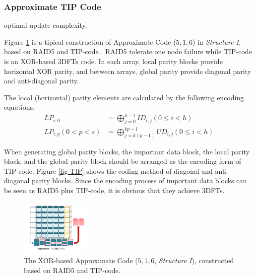 \documentclass[sigconf]{acmart}
\begin{document}
\subsubsection{Approximate TIP Code}

optimal update complexity.

Figure \ref{fig-ap-TIP} is a tipical construction of Approximate Code ($5,1,6$) in \emph{Structure I}, based on RAID5 and TIP-code \cite{zhang2015tip}. RAID5 tolerate one node failure while TIP-code is an XOR-based 3DFTs code. In each array, local parity blocks provide horizontal XOR parity, and between arrays, global parity provide diagonal parity and anti-diagonal parity. 

The local (horizontal) parity elements are calculated by the following encoding equations.
\begin{align}
    LP_{i,0} &= \bigoplus_{j=0}^{k-1} ID_{i,j} (0 \leqslant i < h)\\
    LP_{i,p}(0<p<s) &= \bigoplus_{j=k(p-1)}^{kp-1} UD_{i,j} (0 \leqslant i < h)
\end{align}

When generating global parity blocks, the important data block, the local parity block, and the global parity block should be arranged as the encoding form of TIP-code. Figure \ref{fig-TIP} shows the coding method of diagonal and anti-diagonal parity blocks.
Since the encoding process of important data blocks can be seen as RAID5 plus TIP-code, it is obvious that they achieve 3DFTs.

\begin{figure}[ht]
\centering
\includegraphics[width=0.3\textwidth]{photo/AP-516.pdf}
\caption{The XOR-based Approximate Code ($5,1,6$, \emph{Structure I}), constructed based on RAID5 and TIP-code.}
\label{fig-ap-TIP}
\end{figure}
\end{document}
